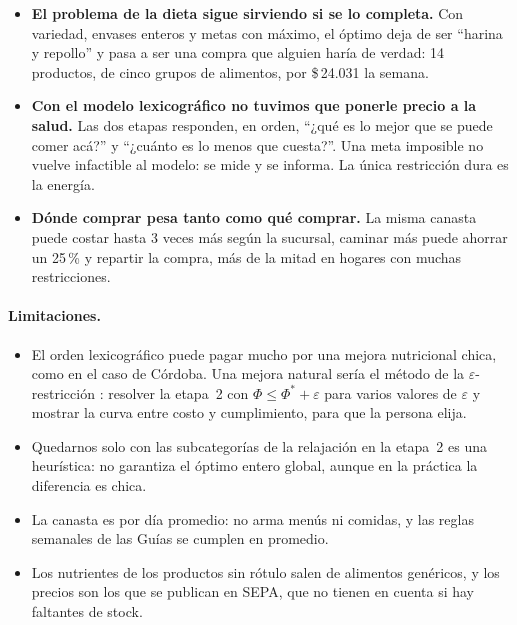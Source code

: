 \documentclass[10pt,a4paper]{article}
\newcommand{\pesos}[1]{\$\,#1}
\begin{document}
\begin{itemize}
  \item \textbf{El problema de la dieta sigue sirviendo si se lo completa.} Con
        variedad, envases enteros y metas con máximo, el óptimo deja de ser ``harina
        y repollo'' y pasa a ser una compra que alguien haría de verdad: 14
        productos, de cinco grupos de alimentos, por \pesos{24.031} la semana.
  \item \textbf{Con el modelo lexicográfico no tuvimos que ponerle precio a la
        salud.} Las dos etapas responden, en orden, ``¿qué es lo mejor que se puede
        comer acá?'' y ``¿cuánto es lo menos que cuesta?''. Una meta imposible no
        vuelve infactible al modelo: se mide y se informa. La única restricción dura
        es la energía.
  \item \textbf{Dónde comprar pesa tanto como qué comprar.} La misma canasta puede
        costar hasta 3 veces más según la sucursal, caminar más puede ahorrar un
        25\,\% y repartir la compra, más de la mitad en hogares con muchas
        restricciones.
\end{itemize}

\paragraph{Limitaciones.}
\begin{itemize}
  \item El orden lexicográfico puede pagar mucho por una mejora nutricional chica,
        como en el caso de Córdoba. Una mejora natural sería el método de la
        $\varepsilon$-restricción \cite{chankong}: resolver la etapa~2 con
        $\Phi \leq \Phi^\ast + \varepsilon$ para varios valores de $\varepsilon$ y
        mostrar la curva entre costo y cumplimiento, para que la persona elija.
  \item Quedarnos solo con las subcategorías de la relajación en la etapa~2 es una
        heurística: no garantiza el óptimo entero global, aunque en la práctica la
        diferencia es chica.
  \item La canasta es por día promedio: no arma menús ni comidas, y las reglas
        semanales de las Guías se cumplen en promedio.
  \item Los nutrientes de los productos sin rótulo salen de alimentos genéricos, y
        los precios son los que se publican en SEPA, que no tienen en cuenta si hay
        faltantes de stock.
\end{itemize}
\end{document}
